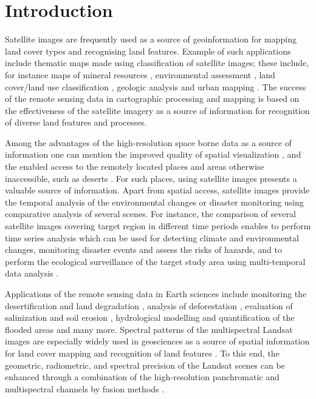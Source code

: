 \documentclass[information,article,submit,pdftex,moreauthors]{Definitions/mdpi}
\begin{document}
\section{Introduction}

Satellite images are frequently used as a source of geoinformation for mapping land cover types and recognising land features. Example of such applications include thematic maps made using classification of satellite images; these include, for instance maps of mineral resources \cite{ABDELKAREEM2018682,1294518,rs11121450}, environmental assessment \cite{615837,Lemenkova202227}, land cover/land use classification \cite{516791,Lemenkova202229}, geologic analysis \cite{6723607,KAMEL2022104420} and urban mapping \cite{MOHAMED2019103507}. The success of the remote sensing data in cartographic processing and mapping is based on the effectiveness of the satellite imagery as a source of information for recognition of diverse land features and processes. 

Among the advantages of the high-resolution space borne data as a source of information one can mention the improved quality of spatial visualization \cite{ABDALLA20128,Lemenkova202230}, and the enabled access to the remotely located places and areas otherwise inaccessible, such as deserts \cite{6350376}. For such places, using satellite images presents a valuable source of information. Apart from spatial access, satellite images provide the temporal analysis of the environmental changes or disaster monitoring using comparative analysis of several scenes. For instance, the comparison of several satellite images covering target region in different time periods enables to perform time series analysis which can be used for detecting climate and environmental changes, monitoring disaster events and assess the risks of hazards, and to perform the ecological surveillance of the target study area using multi-temporal data analysis \cite{9171725,SINGH2020423,Hashim}. 

Applications of the remote sensing data in Earth sciences include monitoring the desertification and land degradation \cite{Badreldin,Kawy}, analysis of deforestation \cite{516791}, evaluation of salinization \cite{8949893} and soil erosion \cite{Gad2020}, hydrological modelling and quantification of the flooded areas \cite{TAHA2017157,ELSADEK2019377} and many more. Spectral patterns of the multispectral Landsat images are especially widely used in geosciences as a source of spatial information for land cover mapping and recognition of land features \cite{8486245}. To this end, the geometric, radiometric, and spectral precision of the Landsat scenes can be enhanced through a combination of the high-resolution panchromatic and multispectral channels by fusion methods \cite{4420687}.
\end{document}
